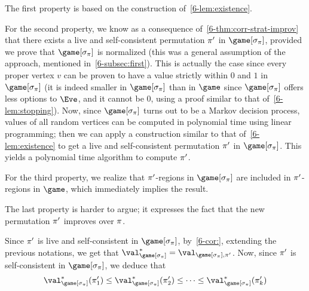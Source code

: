 The first property is based on the construction of~\cref{6-lem:existence}.

For the second property, we know as a consequence of~\cref{6-thm:corr-strat-improv} that there exists a live and
self-consistent permutation $\pi'$ in $\game[\sigma_{\perm}]$,
provided we prove that $\game[\sigma_{\perm}]$ is normalized (this was
a general assumption of the approach, mentioned in~\cref{6-subsec:first}). This is actually the case since
every proper vertex $v$ can be proven to have a value strictly within
$0$ and $1$ in $\game[\sigma_{\perm}]$ (it is indeed smaller in
$\game[\sigma_{\perm}]$ than in $\game$ since $\game[\sigma_{\perm}]$
offers less options to $\Eve$, and it cannot be $0$, using a proof
similar to that of~\cref{6-lem:stopping}).
Now, since $\game[\sigma_\perm]$ turns out to be a Markov decision
process, values of all random vertices can be computed in polynomial
time using linear programming; then we can apply a construction
similar to that of~\cref{6-lem:existence} to get a live and
self-consistent permutation $\pi'$ in $\game[\sigma_\perm]$. This
yields a polynomial time algorithm to compute $\pi'$.

For the third property, we realize that $\pi'$-regions in $\game[\sigma_\perm]$ are included in $\pi'$-regions in $\game$, which immediately implies the result.

The last property is harder to argue; it expresses the fact that the
new permutation $\pi'$ improves over $\pi$.  %

Since $\pi'$ is live and self-consistent in $\game[\sigma_\perm]$,
by~\cref{6-cor:}, extending the previous notations, we
get that
$\val^*_{\game[\sigma_\perm]} =
\val_{\game[\sigma_\perm],\perm'}$. Now, since $\pi'$ is
self-consistent in $\game[\sigma_\perm]$, we deduce that
\[
\val^*_{\game[\sigma_\perm]}(\perm'_1) \le
\val^*_{\game[\sigma_\perm]}(\perm'_2) \le \dots \le
\val^*_{\game[\sigma_\perm]}(\perm'_k)
\]

